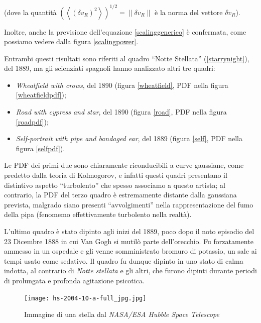 \documentclass[12pt,a4paper]{article}
\newcommand{\norm}[1]{\left\lVert#1\right\rVert}
\numberwithin{equation}{section}
\begin{document}
(dove la quantità $\left(\left\langle
(\delta v_R )^2
\right\rangle\right)^{1/2} = \norm{\delta v_R}$ è la norma del vettore $\delta v_R$).

Inoltre, anche la previsione dell'equazione \eqref{scalinggenerico} è confermata, come possiamo vedere dalla figura \ref{scalingpower}.

Entrambi questi risultati sono riferiti al quadro ``Notte Stellata'' (\ref{starrynight}), del 1889, ma gli scienziati spagnoli hanno analizzato altri tre quadri:

\begin{itemize}
    \item \emph{Wheatfield with crows}, del 1890 (figura \ref{wheatfield}, PDF nella figura \ref{wheatfieldpdf});
    \item \emph{Road with cypress and star}, del 1890 (figura \ref{road}, PDF nella figura \ref{roadpdf});
    \item \emph{Self-portrait with pipe and bandaged ear}, del 1889 (figura \ref{self}, PDF nella figura \ref{selfpdf}).
\end{itemize}

Le PDF dei primi due sono chiaramente riconducibili a curve gaussiane, come predetto dalla teoria di Kolmogorov, e infatti questi quadri presentano il distintivo aspetto ``turbolento'' che spesso associamo a questo artista; al contrario, la PDF del terzo quadro è estremamente distante dalla gaussiana prevista, malgrado siano presenti ``avvolgimenti'' nella rappresentazione del fumo della pipa (fenomemo effettivamente turbolento nella realtà).

L'ultimo quadro è stato dipinto agli inizi del 1889, poco dopo il noto episodio del 23 Dicembre 1888 in cui Van Gogh si mutilò parte dell'orecchio. Fu forzatamente ammesso in un ospedale e gli venne somministrato bromuro di potassio, un sale ai tempi usato come sedativo. Il quadro fu dunque dipinto in uno stato di calma indotta, al contrario di \emph{Notte stellata} e gli altri, che furono dipinti durante periodi di prolungata e profonda agitazione psicotica.

\begin{figure}
    \centering
    \texttt{[image: hs-2004-10-a-full\_jpg.jpg]}
    \caption{Immagine di una stella dal \emph{NASA/ESA Hubble Space
Telescope}}
    \label{galaxy}
\end{figure}



\tableofcontents
\end{document}
